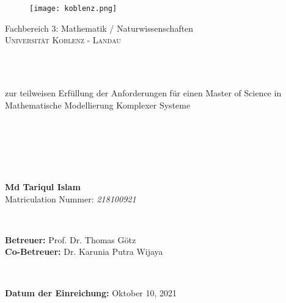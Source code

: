 \thispagestyle{plain}
\begin{spacing}{1.65}
\begin{figure}[H]
\centering
\texttt{[image: koblenz.png]}
\end{figure}

{\begin{center}
Fachbereich 3: Mathematik / Naturwissenschaften\\
\Large{\textsc{Universit\"at Koblenz - Landau}} \\
\end{center}}
~\\
\begin{center}
\textsc{}\\
zur teilweisen Erf\"ullung der Anforderungen f\"ur einen Master of Science in\\
\textsf{\Large{Mathematische Modellierung Komplexer Systeme}}\\
\end{center}
~\\
\begin{spacing}{2.5}
\begin{center}
{\huge \textbf{}}\\
\end{center}
\end{spacing}
~\\
\begin{center}
\textbf{\Large{Md Tariqul Islam}}\\
\large{\textmd{Matriculation Nummer:} \textsl{218100921}}\\
\end{center}
~\\
\begin{center}
\textbf{Betreuer:} Prof. Dr. Thomas G\"otz \\
\textbf{Co-Betreuer:} Dr. Karunia Putra Wijaya\\
\end{center}
~\\
\begin{center}
\textbf{Datum der Einreichung:} Oktober 10, 2021
\end{center}
\end{spacing}
\thispagestyle{empty}
\pagebreak
